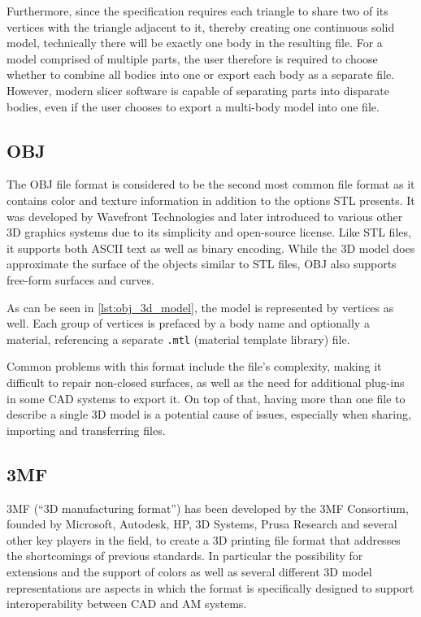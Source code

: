 Furthermore, since the specification requires each triangle to share two of its vertices with the triangle adjacent to it, thereby creating one continuous solid model, technically there will be exactly one body in the resulting file. 
For a model comprised of multiple parts, the user therefore is required to choose whether to combine all bodies into one or export each body as a separate file.
However, modern slicer software is capable of separating parts into disparate bodies, even if the user chooses to export a multi-body model into one file. 


\subsection{OBJ}
\label{chap:obj}

The OBJ file format is considered to be the second most common file format as it contains color and texture information in addition to the options STL presents.
It was developed by Wavefront Technologies and later introduced to various other 3D graphics systems due to its simplicity and open-source license.
Like STL files, it supports both ASCII text as well as binary encoding. 
While the 3D model does approximate the surface of the objects similar to STL files, OBJ also supports free-form surfaces and curves.\cite{kumar_printing_2023}

As can be seen in \ref{lst:obj_3d_model}, the model is represented by vertices as well. 
Each group of vertices is prefaced by a body name and optionally a material, referencing a separate \texttt{.mtl} (material template library) file. 

Common problems with this format include the file's complexity, making it difficult to repair non-closed surfaces, as well as the need for additional plug-ins in some CAD systems to export it. 
On top of that, having more than one file to describe a single 3D model is a potential cause of issues, especially when sharing, importing and transferring files. 


\subsection{3MF}
\label{chap:3mf}

3MF (``3D manufacturing format'') has been developed by the 3MF Consortium, founded by Microsoft, Autodesk, HP, 3D Systems, Prusa Research and several other key players in the field, to create a 3D printing file format that addresses the shortcomings of previous standards.
In particular the possibility for extensions and the support of colors as well as several different 3D model representations are aspects in which the format is specifically designed to support interoperability between CAD and AM systems.\cite{kumar_printing_2023}

